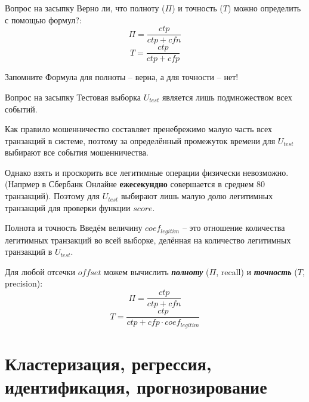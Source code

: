 \documentclass{beamer}
\newcommand{\termdef}[1]{\textbf{\textit{#1}}}
\newcommand{\auditorium}[1]{\color{red}{\textbf{#1}}}
\begin{document}
	\begin{frame}{Вопрос на засыпку}
	Верно ли, что полноту ($\Pi$) и точность ($T$) можно определить с помощью формул?:
	\begin{equation*}
	\Pi = \frac{ctp}{ctp + cfn}
	\end{equation*}
	\begin{equation*}
	T = \frac{ctp}{ctp + cfp}
	\end{equation*}
	 \begin{block}{Запомните}
		Формула для полноты -- верна, а для точности -- нет!
	\end{block}
	\auditorium{Почему?}
	\end{frame}

	\begin{frame}{Вопрос на засыпку}
	Тестовая выборка $U_{test}$ является лишь подмножеством всех событий. 
	
	Как правило мошенничество составляет пренебрежимо малую часть всех транзакций в системе,
	поэтому за определённый промежуток времени для $U_{test}$ выбирают все события мошенничества.
	
	Однако взять и проскорить все легитимные операции физически невозможно.
	(Напрмер в Сбербанк Онлайне \textbf{ежесекундно} совершается в среднем 80 транзакций).
	Поэтому для $U_{test}$ выбирают лишь малую долю легитимных транзакций для проверки функции
	$score$.
	\end{frame}

	\begin{frame}{Полнота и точность}
	Введём величину $coef_{legitim}$ -- это отношение количества легитимных транзакций во всей выборке, 
	делённая на количество легитимных транзакций в  $U_{test}$.
	
	Для любой отсечки $offset$ можем вычислить \termdef{полноту} ($\Pi$, recall) и \termdef{точность} ($T$, precision):
		\begin{equation}\label{eq:recall_by_counts}
		\Pi = \frac{ctp}{ctp + cfn}
		\end{equation}
		\begin{equation}\label{eq:presicionl_by_counts}
		T = \frac{ctp}{ctp + cfp \cdot coef_{legitim}}
		\end{equation}
	\end{frame}

	

   \section{Кластеризация, регрессия, идентификация, прогнозирование}\label{section:all_of_them}	
\end{document}
